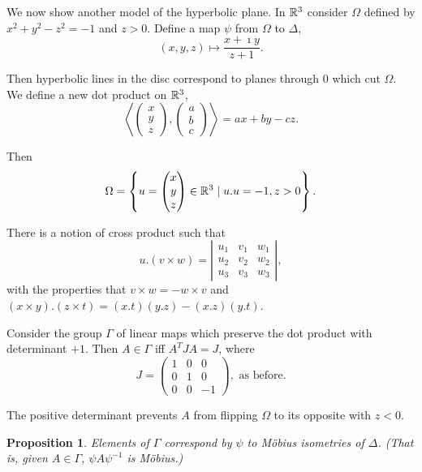 \documentclass{notes}
\theoremstyle{plain}
\newtheorem{proposition}{Proposition}[chapter]
\begin{document}
We now show another model of the hyperbolic plane.  In $\mathbb{R}^3$ consider $\Omega$
defined by $x^2 + y^2 - z^2 = -1$ and $z > 0$.  Define a map $\psi$ from
$\Omega$ to $\Delta$,
\[
(x,y,z) \mapsto \frac{x + \imath y}{z + 1}.
\]

Then hyperbolic lines in the disc correspond to planes through $0$ which cut
$\Omega$.  We define a new dot product on $\mathbb{R}^3$,
\[
\left<
\left(
\begin{matrix} x \\ y \\ z \end{matrix}
\right),
\left(
\begin{matrix} a \\ b \\ c \end{matrix}
\right)
\right> = a x + b y - c z.
\]

Then \[
\Omega = \left\{
u = \left(
\begin{matrix} x \\ y \\ z \end{matrix}
\right) \in \mathbb{R}^3 \mid u.u = -1, z > 0
\right\}.
\]

There is a notion of cross product such that
\[
u.(v \times w) = \left|
\begin{matrix}
u_1 & v_1 & w_1 \\
u_2 & v_2 & w_2 \\
u_3 & v_3 & w_3
\end{matrix}
\right|,
\]
with the properties that $v \times w = - w \times v$ and
$(x \times y) . (z \times t) = (x.t) (y.z) - (x.z) (y.t)$.

Consider the group $\Gamma$ of linear maps which preserve the dot product
with determinant $+1$.  Then $A \in \Gamma$ iff $A^T J A = J$, where
\[
J = \left(
\begin{matrix}
1 & 0 & 0 \\
0 & 1 & 0 \\
0 & 0 & -1
\end{matrix}
\right),\text{ as before.}
\]

The positive determinant prevents $A$ from flipping $\Omega$ to its opposite
with $z < 0$.

\begin{proposition}
Elements of $\Gamma$ correspond by $\psi$ to M\"obius isometries of $\Delta$.
(That is, given $A \in \Gamma$, $\psi A \psi^{-1}$ is M\"obius.)
\end{proposition}
\end{document}
